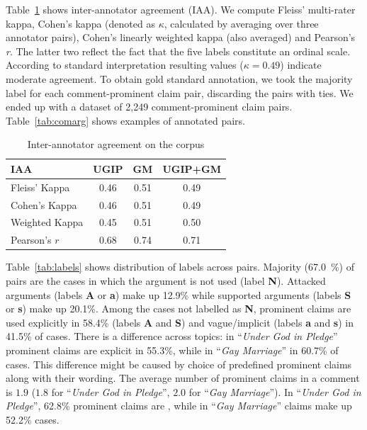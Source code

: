 Table~\ref{tab:iaa} shows inter-annotator agreement (IAA). 
We compute Fleiss' multi-rater kappa, Cohen's kappa (denoted as $\kappa$, calculated by
averaging over three annotator pairs), Cohen's linearly weighted kappa (also
averaged) and Pearson's \textit{r}.
The latter two reflect the fact that the five labels constitute an ordinal scale. 
According to standard interpretation \citep{landis1977measurement} resulting
values ($\kappa = 0.49$) indicate moderate agreement.
To obtain gold standard annotation, we took the majority label for 
each comment-prominent claim pair, discarding the pairs with ties. 
We ended up with a dataset of 2,249 comment-prominent claim pairs. 
Table~\ref{tab:comarg} shows examples of annotated pairs. 

\begin{table}
\centering
{\small
\begin{tabular}{l ccc}
\toprule
IAA & UGIP & GM & UGIP+GM \\
\midrule
Fleiss' Kappa    & 0.46 & 0.51 & 0.49 \\
Cohen's Kappa    & 0.46 & 0.51 & 0.49 \\
Weighted Kappa   & 0.45 & 0.51 &  0.50\\
Pearson's $r$    & 0.68 & 0.74 &  0.71 \\
\bottomrule
\end{tabular}}
\caption{Inter-annotator agreement on the \ComArg corpus}
\label{tab:iaa}
\end{table}


Table~\ref{tab:labels} shows distribution of labels across pairs. 
Majority (67.0~\%) of pairs are the cases in which the argument is not used
(label \textbf{N}).
Attacked arguments (labels \textbf{A} or \textbf{a}) make up 12.9\% while supported
arguments (labels \textbf{S} or \textbf{s}) make up 20.1\%.
Among the cases not labelled as \textbf{N}, prominent claims are used explicitly 
in 58.4\% (labels \textbf{A} and \textbf{S}) and vague/implicit (labels \textbf{a} and \textbf{s})
in 41.5\% of cases. 
There is a difference across topics: in ``\emph{Under God in Pledge}''
prominent claims are explicit in 55.3\%, while in 
``\emph{Gay Marriage}'' in 60.7\% of cases. 
This difference might be caused by 
choice of predefined prominent claims along with their 
wording.  
The average number of prominent claims in a comment is $1.9$ ($1.8$ for 
``\emph{Under God in Pledge}'', $2.0$ for ``\emph{Gay Marriage}''). 
In ``\emph{Under God in Pledge}'', 62.8\% prominent claims are ,
while in ``\emph{Gay Marriage}''  claims 
make up 52.2\% cases. 

